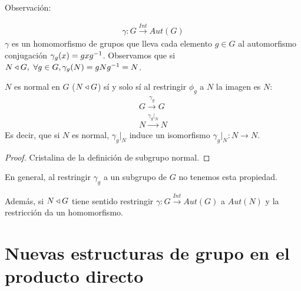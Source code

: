 
Observación:

\begin{align*}
\gamma: G \xrightarrow{Int} Aut(G)
\end{align*}
$\gamma$ es un homomorfismo de grupos que lleva cada elemento $g \in G$ al automorfismo conjugación $\gamma_g(x) = gxg^{-1}$. Observamos que si $N \mathbin{\triangleleft} G,\ \forall g \in G, \gamma_g(N) = gNg^{-1} = N$.

\begin{pro}
	$N$ es normal en $G$ ($N \mathbin{\triangleleft} G$) sí y solo sí al restringir $\phi_g$ a $N$ la imagen es $N$:
	\begin{align*}
	G \xrightarrow{\gamma_g} G \\
	N \xrightarrow{\gamma_g \vert_N} N
	\end{align*}
	Es decir, que si $N$ es normal, $\gamma_g\vert_N$ induce un isomorfismo $\gamma_g\vert_N : N \to N$.
\end{pro}

\begin{proof}
	Cristalina de la definición de subgrupo normal.
\end{proof}

En general, al restringir $\gamma_g$ a un subgrupo de $G$ no tenemos esta propiedad.

Además, si $N \mathbin{\triangleleft} G$ tiene sentido restringir $\gamma: G \xrightarrow{Int} Aut(G)$ a $Aut(N)$ y la restricción da un homomorfismo.

\section{Nuevas estructuras de grupo en el producto directo}

